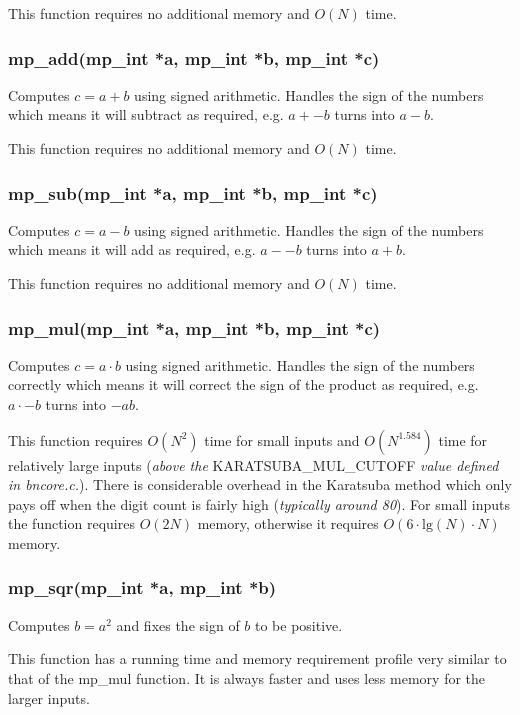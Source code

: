 \documentclass{article}
\begin{document}
This function requires no additional memory and $O(N)$ time.

\subsubsection{mp\_add(mp\_int *a, mp\_int *b, mp\_int *c)}
Computes $c = a + b$ using signed arithmetic.  Handles the sign of the numbers which means it will subtract as 
required, e.g. $a + -b$ turns into $a - b$.

This function requires no additional memory and $O(N)$ time.

\subsubsection{mp\_sub(mp\_int *a, mp\_int *b, mp\_int *c)}
Computes $c = a - b$ using signed arithmetic.   Handles the sign of the numbers which means it will add as 
required, e.g. $a - -b$ turns into $a + b$.

This function requires no additional memory and $O(N)$ time.

\subsubsection{mp\_mul(mp\_int *a, mp\_int *b, mp\_int *c)}
Computes $c = a \cdot b$ using signed arithmetic.  Handles the sign of the numbers correctly which means it will 
correct the sign of the product as required, e.g. $a \cdot -b$ turns into $-ab$.

This function requires $O(N^2)$ time for small inputs and $O(N^{1.584})$ time for relatively large 
inputs (\textit{above the }KARATSUBA\_MUL\_CUTOFF \textit{value defined in bncore.c.}).  There is 
considerable overhead in the Karatsuba method which only pays off when the digit count is fairly high
(\textit{typically around 80}).  For small inputs the function requires $O(2N)$ memory, otherwise it
requires $O(6 \cdot \mbox{lg}(N) \cdot N)$ memory.


\subsubsection{mp\_sqr(mp\_int *a, mp\_int *b)}
Computes $b = a^2$ and fixes the sign of $b$ to be positive.

This function has a running time and memory requirement profile very similar to that of the 
mp\_mul function.  It is always faster and uses less memory for the larger inputs.
\end{document}
